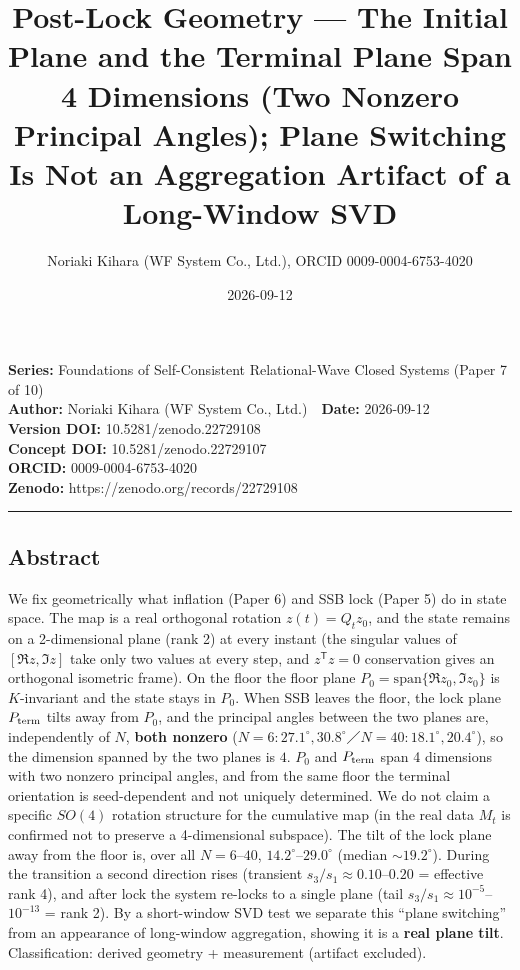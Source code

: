 \documentclass[
  a4paper,
]{ltjsarticle}
\title{Post-Lock Geometry --- The Initial Plane and the Terminal Plane
Span 4 Dimensions (Two Nonzero Principal Angles); Plane Switching Is Not
an Aggregation Artifact of a Long-Window SVD}
\author{Noriaki Kihara (WF System Co., Ltd.), ORCID 0009-0004-6753-4020}
\date{2026-09-12}
\begin{document}
\maketitle

\textbf{Series:} Foundations of Self-Consistent Relational-Wave Closed
Systems (Paper 7 of 10)\\
\textbf{Author:} Noriaki Kihara (WF System Co., Ltd.)　\textbf{Date:}
2026-09-12\\
\textbf{Version DOI:} 10.5281/zenodo.22729108\\
\textbf{Concept DOI:} 10.5281/zenodo.22729107\\
\textbf{ORCID:} 0009-0004-6753-4020\\
\textbf{Zenodo:} https://zenodo.org/records/22729108\\

\begin{center}\rule{0.5\linewidth}{0.5pt}\end{center}

\subsection{Abstract}\label{abstract}

We fix geometrically what inflation (Paper 6) and SSB lock (Paper 5) do
in state space. The map is a real orthogonal rotation \(z(t)=Q_t z_0\),
and the state remains on a 2-dimensional plane (rank 2) at every instant
(the singular values of \([\Re z,\Im z]\) take only two values at every
step, and \(z^{\mathsf T}z=0\) conservation gives an orthogonal
isometric frame). On the floor the floor plane
\(P_0=\mathrm{span}\{\Re z_0,\Im z_0\}\) is \(K\)-invariant and the
state stays in \(P_0\). When SSB leaves the floor, the lock plane
\(P_{\rm term}\) tilts away from \(P_0\), and the principal angles
between the two planes are, independently of \(N\), \textbf{both
nonzero}
(\(N=6{:}27.1^\circ,30.8^\circ\)／\(N=40{:}18.1^\circ,20.4^\circ\)), so
the dimension spanned by the two planes is \(4\). \(P_0\) and
\(P_{\rm term}\) span 4 dimensions with two nonzero principal angles,
and from the same floor the terminal orientation is seed-dependent and
not uniquely determined. We do not claim a specific \(SO(4)\) rotation
structure for the cumulative map (in the real data \(M_t\) is confirmed
not to preserve a 4-dimensional subspace). The tilt of the lock plane
away from the floor is, over all \(N=6\)--\(40\),
\(14.2^\circ\)--\(29.0^\circ\) (median \(\sim19.2^\circ\)). During the
transition a second direction rises (transient
\(s_3/s_1\approx0.10\)--\(0.20\) = effective rank 4), and after lock the
system re-locks to a single plane (tail
\(s_3/s_1\approx10^{-5}\)--\(10^{-13}\) = rank 2). By a short-window SVD
test we separate this ``plane switching'' from an appearance of
long-window aggregation, showing it is a \textbf{real plane tilt}.
Classification: derived geometry + measurement (artifact excluded).
\end{document}
